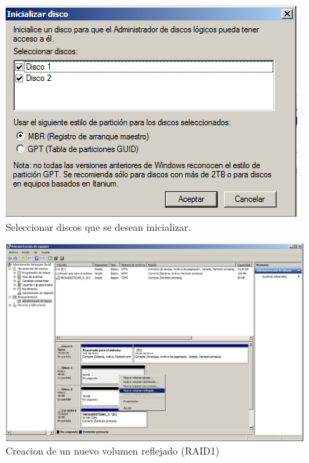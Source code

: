 \begin{figure}[H]
    \begin{center}
        \includegraphics[scale=0.7]{Imagenes/paso3}
        \caption{Seleccionar discos que se desean inicializar.}
        \label{fig12}
    \end{center}
\end{figure}

\begin{figure}[H]
    \begin{center}
        \advance\leftskip-2.1cm
        \includegraphics[scale=0.45]{Imagenes/paso4}
        \caption{Creacion de un nuevo volumen reflejado (RAID1) }
        \label{fig13}
    \end{center}
\end{figure}

